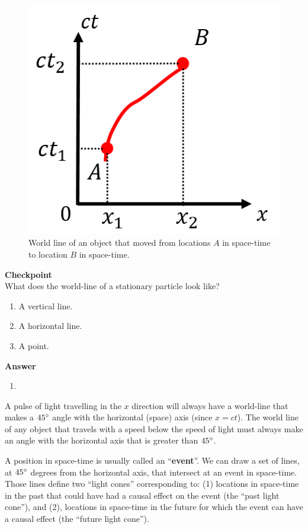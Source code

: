 \begin{figure}[!htbp]
\centering
\includegraphics[width=0.5\linewidth]{files/spacetime-42568f401ab38be97970e178fd2c7aed.png}
\caption[]{World line of an object that moved from locations $A$ in space-time to location $B$ in space-time.}
\label{fig:specialrelativity:spacetime}
\end{figure}

\begin{framed}
\textbf{Checkpoint}\\
What does the world-line of a stationary particle look like?

\begin{enumerate}
\item A vertical line.
\item A horizontal line.
\item A point.
\end{enumerate}

\begin{framed}
\textbf{Answer}\\
\begin{enumerate}
\item
\end{enumerate}
\end{framed}
\end{framed}

A pulse of light travelling in the $x$ direction will always have a world-line that makes a $45 {\rm \degree}$ angle with the horizontal (space) axis (since $x=ct$). The world line of any object that travels with a speed below the speed of light must always make an angle with the horizontal axis that is greater than $45 {\rm \degree}$.

A position in space-time is usually called an ``\textbf{event}''. We can draw a set of lines, at $45 {\rm \degree}$ degrees from the horizontal axis, that intersect at an event in space-time. Those lines define two ``light cones'' corresponding to: (1) locations in space-time in the past that could have had a causal effect on the event (the ``past light cone''), and (2), locations in space-time in the future for which the event can have a causal effect (the ``future light cone'').

